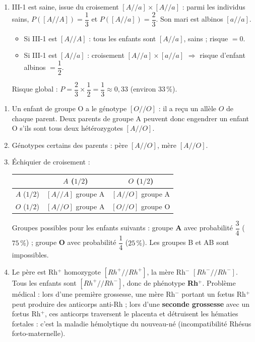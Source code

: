 \documentclass[11pt]{article}
\newcommand{\cle}[1]{{\popxbold\color{popdark}#1}}
\begin{document}
\begin{corrige}
\begin{enumerate}
\item III-1 est saine, issue du croisement $[A//a]\times[A//a]$ : parmi les individus sains, $P([A//A])=\dfrac{1}{3}$ et $P([A//a])=\dfrac{2}{3}$. Son mari est albinos $[a//a]$.
\begin{itemize}
\item Si III-1 est $[A//A]$ : tous les enfants sont $[A//a]$, sains ; risque $=0$.
\item Si III-1 est $[A//a]$ : croisement $[A//a]\times[a//a]$ $\Rightarrow$ risque d'enfant albinos $=\dfrac{1}{2}$.
\end{itemize}
Risque global : $P=\dfrac{2}{3}\times\dfrac{1}{2}=\dfrac{1}{3}\approx 0,33$ (environ $33\,\%$).
\end{enumerate}
\end{corrige}

\begin{corrige}
\begin{enumerate}
\item Un enfant de groupe O a le génotype $[O//O]$ : il a reçu un allèle $O$ de chaque parent. Deux parents de groupe A peuvent donc engendrer un enfant O s'ils sont tous deux hétérozygotes $[A//O]$.
\item Génotypes certains des parents : père $[A//O]$, mère $[A//O]$.
\item Échiquier de croisement :
\begin{center}
\begin{tabular}{|c|c|c|}\hline
\rowcolor{popblueL} & $A$ ($1/2$) & $O$ ($1/2$) \\ \hline
$A$ ($1/2$) & $[A//A]$ groupe A & $[A//O]$ groupe A \\ \hline
$O$ ($1/2$) & $[A//O]$ groupe A & $[O//O]$ groupe O \\ \hline
\end{tabular}
\end{center}
Groupes possibles pour les enfants suivants : groupe \textbf{A} avec probabilité $\dfrac{3}{4}$ ($75\,\%$) ; groupe \textbf{O} avec probabilité $\dfrac{1}{4}$ ($25\,\%$). Les groupes B et AB sont impossibles.
\item Le père est Rh$^{+}$ homozygote $[Rh^{+}//Rh^{+}]$, la mère Rh$^{-}$ $[Rh^{-}//Rh^{-}]$. Tous les enfants sont $[Rh^{+}//Rh^{-}]$, donc de phénotype \textbf{Rh$^{+}$}. Problème médical : lors d'une première grossesse, une mère Rh$^{-}$ portant un fœtus Rh$^{+}$ peut produire des anticorps anti-Rh ; lors d'une \textbf{seconde grossesse} avec un fœtus Rh$^{+}$, ces anticorps traversent le placenta et détruisent les hématies fœtales : c'est la \cle{maladie hémolytique du nouveau-né} (incompatibilité Rhésus fœto-maternelle).
\end{enumerate}
\end{corrige}
\end{document}
